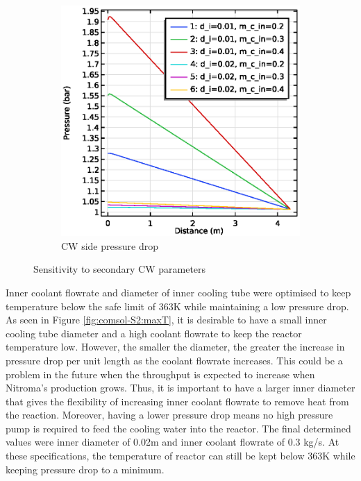 \begin{figure}[h]
\begin{subfigure}{0.49\linewidth}
        \includegraphics[width=\linewidth]{figures/S2-CW-Pdrop.eps}
        \caption{CW side pressure drop}
        \label{fig:comsol-S2:CW-Pdrop}
    \end{subfigure}

    \caption{Sensitivity to secondary CW parameters}
    \label{fig:comsol-S2}
\end{figure}
Inner coolant flowrate and diameter of inner cooling tube were optimised to keep temperature below the safe limit of 363K while maintaining a low pressure drop. As seen in Figure \ref{fig:comsol-S2:maxT}, it is desirable to have a small inner cooling tube diameter and a high coolant flowrate to keep the reactor temperature low. However, the smaller the diameter, the greater the increase in pressure drop per unit length as the coolant flowrate increases. This could be a problem in the future when the throughput is expected to increase when Nitroma's production grows. Thus, it is important to have a larger inner diameter that gives the flexibility of increasing inner coolant flowrate to remove heat from the reaction. Moreover, having a lower pressure drop means no high pressure pump is required to feed the cooling water into the reactor. The final determined values were inner diameter of 0.02m and inner coolant flowrate of 0.3 kg/s. At these specifications, the temperature of reactor can still be kept below 363K while keeping pressure drop to a minimum.

